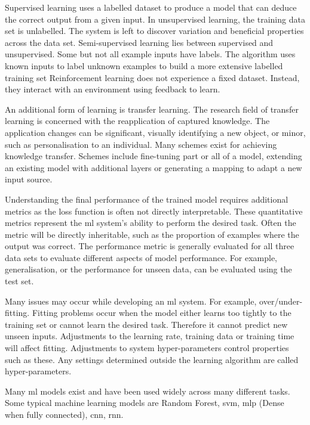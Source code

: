 Supervised learning uses a labelled dataset to produce a model that can deduce the correct output from a given input\cite{Burkov2019}. In unsupervised learning, the training data set is unlabelled. The system is left to discover variation and beneficial properties across the data set. Semi-supervised learning lies between supervised and unsupervised. Some but not all example inputs have labels. The algorithm uses known inputs to label unknown examples to build a more extensive labelled training set\cite{Abdallah2018} Reinforcement learning does not experience a fixed dataset. Instead, they interact with an environment using feedback to learn.

An additional form of learning is transfer learning. The research field of transfer learning is concerned with the reapplication of captured knowledge. The application changes can be significant, visually identifying a new object, or minor, such as personalisation to an individual. Many schemes exist for achieving knowledge transfer. Schemes include fine-tuning part or all of a model, extending an existing model with additional layers or generating a mapping to adapt a new input source.\cite{Farahani2020, Zhuang2021}

Understanding the final performance of the trained model requires additional metrics as the loss function is often not directly interpretable. These quantitative metrics represent the \acrshort{ml} system's ability to perform the desired task. Often the metric will be directly inheritable, such as the proportion of examples where the output was correct. The performance metric is generally evaluated for all three data sets to evaluate different aspects of model performance. For example, generalisation, or the performance for unseen data, can be evaluated using the test set.

Many issues may occur while developing an \acrshort{ml} system. For example, over/under-fitting. Fitting problems occur when the model either learns too tightly to the training set or cannot learn the desired task. Therefore it cannot predict new unseen inputs. Adjustments to the learning rate, training data or training time will affect fitting. Adjustments to system hyper-parameters control properties such as these. Any settings determined outside the learning algorithm are called hyper-parameters.\cite{Goodfellow2015}

Many \acrshort{ml} models exist and have been used widely across many different tasks. Some typical machine learning models are Random Forest, \acrfull{svm}, \acrfull{mlp} (Dense when fully connected), \acrfull{cnn}, \acrfull{rnn}.

